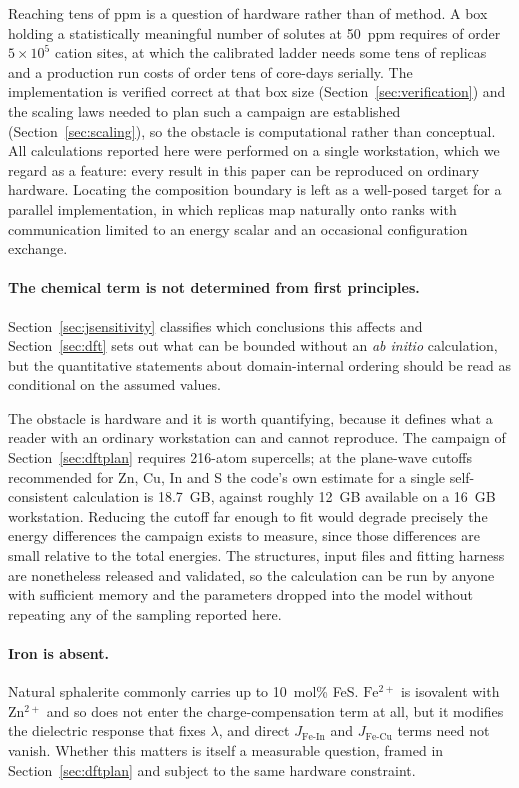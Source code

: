 \documentclass[11pt,a4paper]{article}
\begin{document}
Reaching tens of ppm is a question of hardware rather than of method. A box
holding a statistically meaningful number of solutes at 50~ppm requires of order
$5\times10^5$ cation sites, at which the calibrated ladder needs some tens of
replicas and a production run costs of order tens of core-days serially. The
implementation is verified correct at that box size
(Section~\ref{sec:verification}) and the scaling laws needed to plan such a
campaign are established (Section~\ref{sec:scaling}), so the obstacle is
computational rather than conceptual. All calculations reported here were
performed on a single workstation, which we regard as a feature: every result in
this paper can be reproduced on ordinary hardware. Locating the composition
boundary is left as a well-posed target for a parallel implementation, in which
replicas map naturally onto ranks with communication limited to an energy scalar
and an occasional configuration exchange.

\paragraph{The chemical term is not determined from first principles.}
Section~\ref{sec:jsensitivity} classifies which conclusions this affects and
Section~\ref{sec:dft} sets out what can be bounded without an \textit{ab initio}
calculation, but the quantitative statements about domain-internal ordering
should be read as conditional on the assumed values.

The obstacle is hardware and it is worth quantifying, because it defines what a
reader with an ordinary workstation can and cannot reproduce. The campaign of
Section~\ref{sec:dftplan} requires 216-atom supercells; at the plane-wave
cutoffs recommended for Zn, Cu, In and S the code's own estimate for a single
self-consistent calculation is 18.7~GB, against roughly 12~GB available on a
16~GB workstation.
Reducing the cutoff far enough to fit would degrade precisely the energy
differences the campaign exists to measure, since those differences are small
relative to the total energies. The structures, input files and fitting harness
are nonetheless released and validated, so the calculation can be run by anyone
with sufficient memory and the parameters dropped into the model without
repeating any of the sampling reported here.

\paragraph{Iron is absent.} Natural sphalerite commonly carries up to 10~mol\%
FeS. $\mathrm{Fe^{2+}}$ is isovalent with $\mathrm{Zn^{2+}}$ and so does not
enter the charge-compensation term at all, but it modifies the dielectric
response that fixes $\lambda$, and direct $J_{\mathrm{Fe\text{-}In}}$ and
$J_{\mathrm{Fe\text{-}Cu}}$ terms need not vanish. Whether this matters is
itself a measurable question, framed in Section~\ref{sec:dftplan} and subject to
the same hardware constraint.
\end{document}

